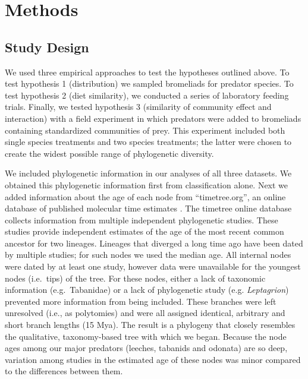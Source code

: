 \section{Methods}\label{methods}

\subsection{Study Design}\label{study-design}

We used three empirical approaches to test the hypotheses outlined
above. To test hypothesis 1 (distribution) we sampled bromeliads for
predator species. To test hypothesis 2 (diet similarity), we conducted a
series of laboratory feeding trials. Finally, we tested hypothesis 3
(similarity of community effect and interaction) with a field experiment
in which predators were added to bromeliads containing standardized
communities of prey. This experiment included both single species
treatments and two species treatments; the latter were chosen to create
the widest possible range of phylogenetic diversity.

We included phylogenetic information in our analyses of all three
datasets. We obtained this phylogenetic information first from
classification alone. Next we added information about the age of each
node from ``timetree.org'', an online database of published molecular
time estimates \citep{Hedges2006}. The timetree online database collects
information from multiple independent phylogenetic studies. These
studies provide independent estimates of the age of the most recent
common ancestor for two lineages. Lineages that diverged a long time ago
have been dated by multiple studies; for such nodes we used the median
age. All internal nodes were dated by at least one study, however data
were unavailable for the youngest nodes (i.e.~tips) of the tree. For
these nodes, either a lack of taxonomic information (e.g.~Tabanidae) or
a lack of phylogenetic study (e.g. \emph{Leptagrion}) prevented more
information from being included. These branches were left unresolved
(i.e., as polytomies) and were all assigned identical, arbitrary and
short branch lengths (15 Mya). The result is a phylogeny that closely
resembles the qualitative, taxonomy-based tree with which we began.
Because the node ages among our major predators (leeches, tabanids and
odonata) are so deep, variation among studies in the estimated age of
these nodes was minor compared to the differences between them.

